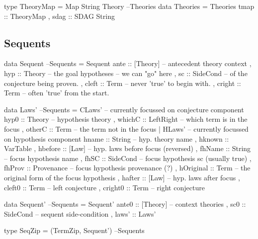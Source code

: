 \begin{code}
type TheoryMap = Map String Theory                                  --Theories
data Theories
  = Theories { tmap :: TheoryMap
             , sdag :: SDAG String }
\end{code}

\subsection{Sequents}

\begin{code}
data Sequent                                                        --Sequents
  = Sequent {
     ante :: [Theory] -- antecedent theory context
   , hyp :: Theory -- the goal hypotheses -- we can "go" here
   , sc :: SideCond -- of the conjecture being proven.
   , cleft :: Term -- never 'true' to begin with.
   , cright :: Term -- often 'true' from the start.
   }
\end{code}

\begin{code}
data Laws'                                                          --Sequents
  = CLaws' { -- currently focussed on conjecture component
      hyp0  :: Theory -- hypothesis theory
    , whichC :: LeftRight -- which term is in the focus
    , otherC :: Term  -- the term not in the focus
    }
  | HLaws' { -- currently focussed on hypothesis component
      hname     :: String -- hyp. theory name
    , hknown    :: VarTable
    , hbefore   :: [Law] -- hyp. laws before focus (reversed)
    , fhName    :: String -- focus hypothesis name
    , fhSC      :: SideCond -- focus hypothesis sc (usually true)
    , fhProv    :: Provenance -- focus hypothesis provenance (?)
    , hOriginal :: Term -- the original form of the focus hypothesis
    , hafter    :: [Law] -- hyp. laws after focus
    , cleft0    :: Term -- left conjecture
    , cright0   :: Term -- right conjecture
    }
\end{code}


\begin{code}
data Sequent'                                                       --Sequents
  = Sequent' {
      ante0 :: [Theory] -- context theories
    , sc0       :: SideCond -- sequent side-condition
    , laws'     :: Laws'
    }
\end{code}


\begin{code}
type SeqZip = (TermZip, Sequent')                                   --Sequents
\end{code}

